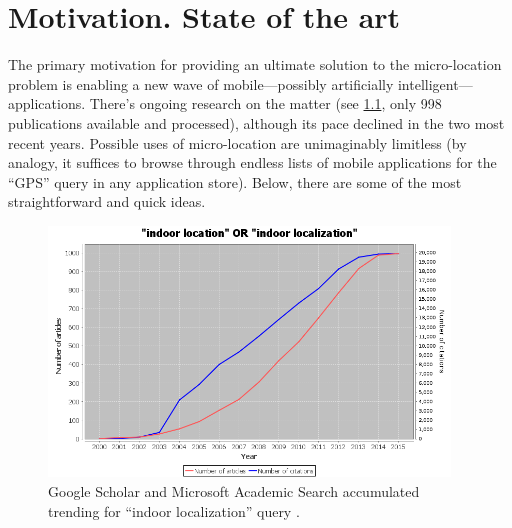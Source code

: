 \chapter{Motivation. State of the art}
\label{cha:state-of-the-art}


The primary motivation for providing an ultimate solution to the micro-location problem is enabling a new wave of mobile---possibly artificially intelligent---applications. There's ongoing research on the matter (see \cref{fig:scholar-indoor}, only 998 publications available and processed), although its pace declined in the two most recent years. Possible uses of micro-location are unimaginably limitless (by analogy, it suffices to browse through endless lists of mobile applications for the ``GPS'' query in any application store). Below, there are some of the most straightforward and quick ideas.

\begin{figure}
	\centering
	\includegraphics[width=0.95\textwidth]{scholar-indoor}
	\caption{Google Scholar and Microsoft Academic Search accumulated trending for ``indoor localization'' query \cite{Rus:scholar-trends}.}
	\label{fig:scholar-indoor}
\end{figure}

